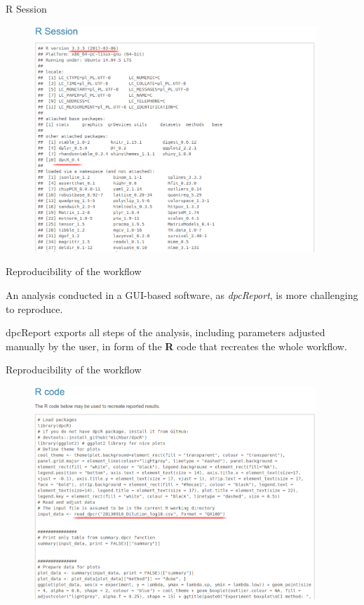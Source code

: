 \documentclass{beamer}\usepackage[]{graphicx}\usepackage[]{color}
\begin{document}
\begin{frame}{R Session}
\begin{figure} 
\includegraphics[width=0.95\textwidth]{static_figure/dcpReport_reprod6.png}
\end{figure}
\end{frame}


\begin{frame}{Reproducibility of the workflow}

An analysis conducted in a GUI-based software, as \textit{dpcReport}, is more challenging to reproduce.

dpcReport exports all steps of the analysis, including parameters adjusted manually by the user, in form of the \textbf{R} code that recreates the whole workflow.

\end{frame}

\begin{frame}{Reproducibility of the workflow}
\begin{figure} 
\includegraphics[width=0.95\textwidth]{static_figure/dcpReport_reprod7.png}
\end{figure}
\end{frame}
\end{document}
